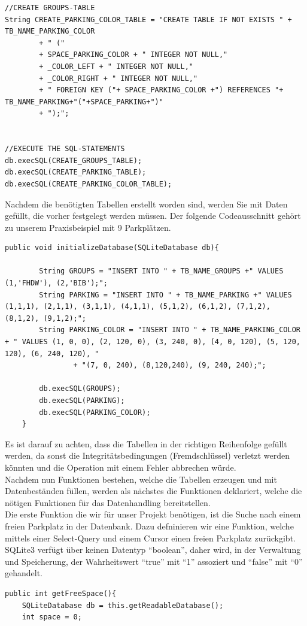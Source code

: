 \documentclass[11pt]{article}
\begin{document}
\begin{onehalfspacing}
\begin{lstlisting}
//CREATE GROUPS-TABLE
String CREATE_PARKING_COLOR_TABLE = "CREATE TABLE IF NOT EXISTS " + TB_NAME_PARKING_COLOR
		+ " (" 
		+ SPACE_PARKING_COLOR + " INTEGER NOT NULL,"
		+ _COLOR_LEFT + " INTEGER NOT NULL,"
		+ _COLOR_RIGHT + " INTEGER NOT NULL,"
		+ " FOREIGN KEY ("+ SPACE_PARKING_COLOR +") REFERENCES "+ TB_NAME_PARKING+"("+SPACE_PARKING+")"
		+ ");";


//EXECUTE THE SQL-STATEMENTS
db.execSQL(CREATE_GROUPS_TABLE);
db.execSQL(CREATE_PARKING_TABLE);
db.execSQL(CREATE_PARKING_COLOR_TABLE);	
\end{lstlisting}

Nachdem die benötigten Tabellen erstellt worden sind, werden Sie mit Daten
gefüllt, die vorher festgelegt werden müssen. Der folgende Codeausschnitt gehört
zu unserem Praxisbeispiel mit 9 Parkplätzen.
\begin{lstlisting}
public void initializeDatabase(SQLiteDatabase db){
		
		String GROUPS = "INSERT INTO " + TB_NAME_GROUPS +" VALUES (1,'FHDW'), (2,'BIB');";
		String PARKING = "INSERT INTO " + TB_NAME_PARKING +" VALUES (1,1,1), (2,1,1), (3,1,1), (4,1,1), (5,1,2), (6,1,2), (7,1,2), (8,1,2), (9,1,2);";
		String PARKING_COLOR = "INSERT INTO " + TB_NAME_PARKING_COLOR + " VALUES (1, 0, 0), (2, 120, 0), (3, 240, 0), (4, 0, 120), (5, 120, 120), (6, 240, 120), "
				+ "(7, 0, 240), (8,120,240), (9, 240, 240);";
	
		db.execSQL(GROUPS);
		db.execSQL(PARKING);
		db.execSQL(PARKING_COLOR);
	}
\end{lstlisting}
Es ist darauf zu achten, dass die Tabellen in der richtigen Reihenfolge gefüllt
werden, da sonst die Integritätsbedingungen (Fremdschlüssel) verletzt werden
könnten und die Operation mit einem Fehler abbrechen würde. \\

Nachdem nun Funktionen bestehen, welche die Tabellen erzeugen und mit
Datenbeständen füllen, werden als nächstes die Funktionen deklariert, welche die
nötigen Funktionen für das Datenhandling bereitstellen. \\
Die erste Funktion die wir für unser Projekt benötigen, ist die Suche nach einem
freien Parkplatz in der Datenbank. Dazu defninieren wir eine Funktion, welche
mittels einer Select-Query und einem Cursor einen freien Parkplatz zurückgibt.
SQLite3 verfügt über keinen Datentyp "`boolean"', daher wird, in der Verwaltung
und Speicherung, der Wahrheitswert "`true"' mit "`1"' assoziert und "`false"'
mit "`0"' gehandelt.
\begin{lstlisting}
public int getFreeSpace(){
	SQLiteDatabase db = this.getReadableDatabase();
	int space = 0;
	

\end{lstlisting}
\end{onehalfspacing}
\end{document}
